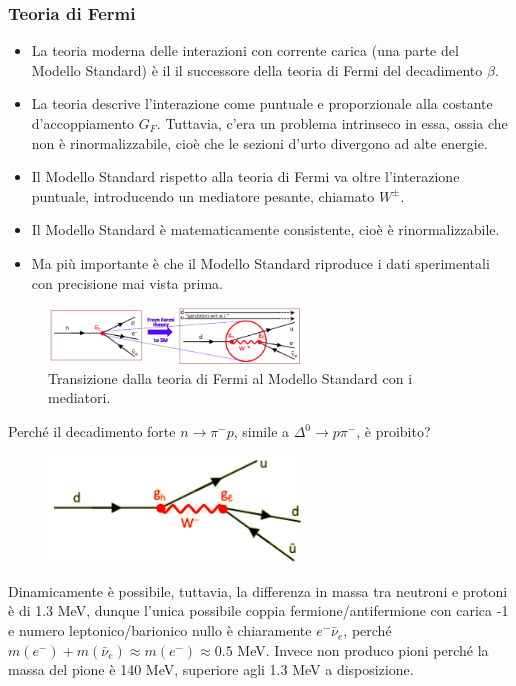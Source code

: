 \subsubsection{Teoria di Fermi}
\begin{itemize}
    \item La teoria moderna delle interazioni con corrente carica (una parte del Modello Standard) è il il successore della teoria di Fermi del decadimento $\beta$. 
    \item La teoria descrive l'interazione come puntuale e proporzionale alla costante d'accoppiamento $G_F$. Tuttavia, c'era un problema intrinseco in essa, ossia che non è rinormalizzabile, cioè che le sezioni d'urto divergono ad alte energie.
    \item Il Modello Standard rispetto alla teoria di Fermi va oltre l'interazione puntuale, introducendo un mediatore pesante, chiamato $W^\pm$.
    \item Il Modello Standard è matematicamente consistente, cioè è rinormalizzabile.
    \item Ma più importante è che il Modello Standard riproduce i dati sperimentali con precisione mai vista prima.
\end{itemize}
\begin{figure}[H]
    \centering
    \includegraphics[width=0.6\textwidth]{immagini/fig_fermi_to_ms.png}
    \caption{Transizione dalla teoria di Fermi al Modello Standard con i mediatori.}
\end{figure}
Perché il decadimento forte $n\to \pi^-p$, simile a $\Delta^0\to p\pi^-$, è proibito?
\begin{figure}[H]
    \centering
    \includegraphics[width=0.6\textwidth]{immagini/fig_n_p_pi.png}
\end{figure}
Dinamicamente è possibile, tuttavia, la differenza in massa tra neutroni e protoni è di 1.3 MeV, dunque l'unica possibile coppia fermione/antifermione con carica -1 e numero leptonico/barionico nullo è chiaramente $e^-\bar \nu_e$, perché $m(e^-)+m(\bar\nu_e)\approx m(e^-)\approx0.5$ MeV. Invece non produco pioni perché la massa del pione è 140 MeV, superiore agli 1.3 MeV a disposizione. 
